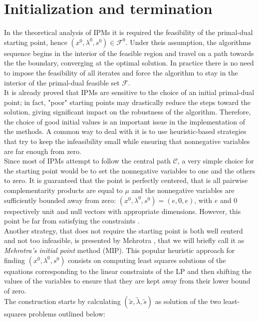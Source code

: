 \documentclass[a4paper,10 pt,titlepage,twoside]{book}
\theoremstyle{plain}
\theoremstyle{definition}
\theoremstyle{remark}
\begin{document}
{{\section*{Initialization and termination}
In the theoretical analysis of IPMs it is required the feasibility of the primal-dual starting point, hence $(x^{0}, \lambda^{0}, s^{0})\in\mathcal{F}^{0}$. Under theis assumption, the algorithms sequence begins in the interior of the feasible region and travel on
a path towards the the boundary, converging at the optimal solution. In practice there is no need to impose the feasibility of all iterates and force the algorithm to stay in the interior of the primal-dual feasible set $\mathcal{F}$.\\
It is already proved that IPMs are sensitive to the choice of an initial primal-dual point; in fact, "poor" starting points may drastically reduce the steps toward the solution, giving significant impact on the robustness of the algorithm. Therefore, the choice of good initial values is an important issue in the implementation of the methods. A common way to deal with it is to use heuristic-based strategies that try to keep the infeasibility small while ensuring that nonnegative variables are far enough from zero.\\
Since most of IPMs attempt to follow the central path $\mathcal{C}$, a very simple choice for the starting point would be to set the nonnegative variables to one and the others to zero. It is guaranteed that the point is perfectly centered, that is all pairwise complementarity products are equal to $\mu$ and the nonnegative variables are sufficiently bounded away from zero: $(x^{0},\lambda^{0},s^{0})=(e, 0, e)$, with $e$ and $0$ respectively unit and null vectors with appropriate dimensions. However, this point be far from satisfying the constraints \cite{VAN}.\\
Another strategy, that does not require the starting point is both well centerd and not too infeasible, is presented by Mehrotra \cite{MER}, that we will briefly call it as \textit{Mehrotra's initial point} method (MIP). This popular heuristic approach for finding $(x^{0}, \lambda^{0}, s^{0})$ consists on computing least squares solutions of the equations corresponding to the linear constraints of the LP and then shifting the values of the variables to ensure that they are kept away from their lower bound of zero. \\
The construction starts by calculating $(\tilde{x}, \tilde{\lambda}, \tilde{s})$ as solution of the two least-squares problems outlined below:
}}
\end{document}
